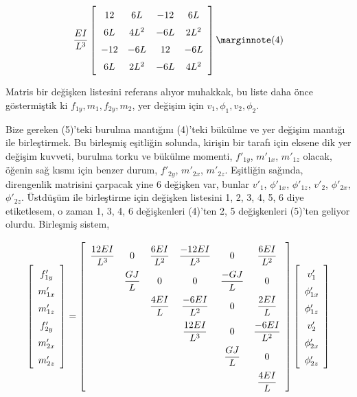 \documentclass[12pt,fleqn]{article}\usepackage{../../common}
\begin{document}
$$
\frac{EI}{L^3}
\left[\begin{array}{cccc}
12 & 6L & -12 & 6L \\
6L & 4L^2 & -6L & 2L^2 \\
-12 & -6L & 12 & -6L \\
6L & 2L^2 & -6L & 4L^2
\end{array}\right]
\mlabel{4}
$$

Matris bir değişken listesini referans alıyor muhakkak, bu liste daha
önce göstermiştik ki $f_{1y}, m_1, f_{2y}, m_2$, yer değişim için
$v_1, \phi_1, v_2, \phi_2$. 

Bize gereken (5)'teki burulma mantığını (4)'teki bükülme ve yer değişim mantığı
ile birleştirmek. Bu birleşmiş eşitliğin solunda, kirişin bir tarafı için eksene
dik yer değişim kuvveti, burulma torku ve bükülme momenti, $f'_{1y}$, $m'_{1x}$,
$m'_{1z}$ olacak, öğenin sağ kısmı için benzer durum, $f'_{2y}$, $m'_{2x}$,
$m'_{2z}$.  Eşitliğin sağında, direngenlik matrisini çarpacak yine 6 değişken
var, bunlar $v'_1$, $\phi'_{1x}$, $\phi'_{1z}$, $v'_2$, $\phi'_{2x}$,
$\phi'_{2z}$. Üstdüşüm ile birleştirme için değişken listesini 1, 2, 3, 4, 5, 6
diye etiketlesem, o zaman 1, 3, 4, 6 değişkenleri (4)'ten 2, 5 değişkenleri
(5)'ten geliyor olurdu. Birleşmiş sistem,

$$
\renewcommand*{\arraystretch}{1.5}
\left[\begin{array}{c}
f'_{1y} \\ m'_{1x} \\ m'_{1z} \\ f'_{2y} \\ m'_{2x} \\ m'_{2z} 
\end{array}\right] =
\renewcommand*{\arraystretch}{2.2}
\left[\begin{array}{cccccc}
\dfrac{12 EI}{L^3} & 0 & \dfrac{6 EI}{L^2} & \dfrac{-12EI}{L^3} & 0 & \dfrac{6EI}{L^2}\\
 & \dfrac{GJ}{L} & 0 & 0 & \dfrac{-GJ}{L} & 0 \\
 & & \dfrac{4EI}{L} & \dfrac{-6EI}{L^2} & 0 & \dfrac{2EI}{L} \\
 & & & \dfrac{12EI}{L^3} & 0 & \dfrac{-6EI}{L^2} \\
 & & & & \dfrac{GJ}{L} & 0 \\
 & & & & & \dfrac{4EI}{L} 
\end{array}\right]
\renewcommand*{\arraystretch}{1.5}
\left[\begin{array}{c}
v'_1 \\ \phi'_{1x} \\ \phi'_{1z} \\ v'_2 \\ \phi'_{2x} \\ \phi'_{2z}
\end{array}\right]
$$
\end{document}
